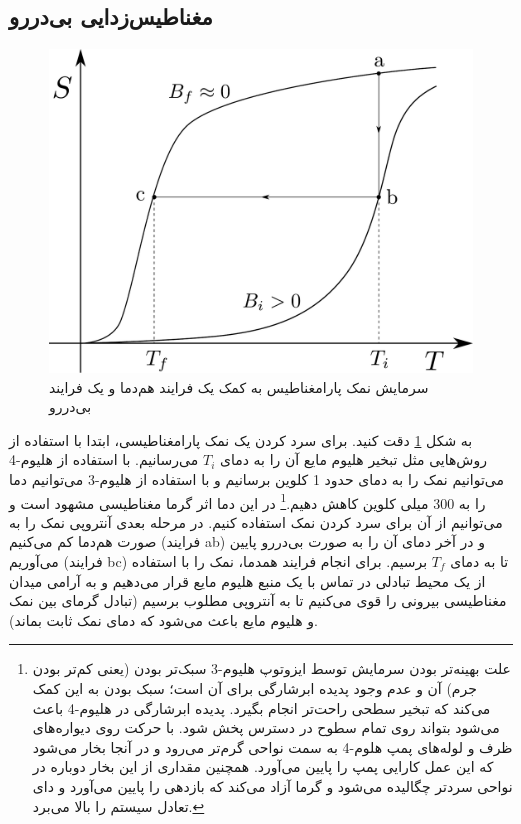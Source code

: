 \documentclass[12pt,a4paper]{article}
\begin{document}
	\subsection{مغناطیس‌زدایی بی‌دررو}
	\begin{figure}[h]
		\centering
		\includegraphics[width=\linewidth]{mag}
		\caption{سرمایش نمک پارامغناطیس به کمک یک فرایند هم‌دما و یک فرایند بی‌دررو}
		\label{fig1}
	\end{figure}
	به شکل \ref{fig1} دقت کنید. برای سرد کردن یک نمک پارامغناطیسی، ابتدا با استفاده از روش‌هایی مثل تبخیر هلیوم مایع آن را به دمای $T_i$ می‌رسانیم.
	با استفاده از هلیوم-4 می‌توانیم نمک را به دمای حدود 1 کلوین برسانیم و با استفاده از هلیوم-3 می‌توانیم دما را به 300 میلی کلوین کاهش دهیم.\footnote{
	علت بهینه‌تر بودن سرمایش توسط ایزوتوپ هلیوم-3 سبک‌تر بودن (یعنی کم‌تر بودن جرم) آن و عدم وجود پدیده ابرشارگی برای آن است؛
	سبک بودن به این کمک می‌کند که تبخیر سطحی راحت‌تر انجام بگیرد. پدیده ابرشارگی در هلیوم-4 باعث می‌شود بتواند روی تمام سطوح در دسترس پخش شود.
	با حرکت روی دیواره‌های ظرف و لوله‌های پمپ هلوم-4 به سمت نواحی گرم‌تر می‌رود و در آنجا بخار می‌شود که این عمل کارایی پمپ را پایین می‌آورد.
	همچنین مقداری از این بخار دوباره در نواحی سردتر چگالیده می‌شود و گرما آزاد می‌کند که بازدهی را پایین می‌آورد و دای تعادل سیستم را بالا می‌برد.}
	در این دما اثر گرما مغناطیسی مشهود است و می‌توانیم از آن برای سرد کردن نمک استفاده کنیم.
	در مرحله بعدی آنتروپی نمک را به صورت هم‌دما کم می‌کنیم (فرایند ab) و در آخر دمای آن را به صورت بی‌دررو پایین می‌آوریم (فرایند bc) تا به دمای $T_f$ برسیم.
	برای انجام فرایند همدما، نمک را با استفاده از یک محیط تبادلی در تماس با یک منبع هلیوم مایع قرار می‌دهیم و
	به آرامی میدان مغناطیسی بیرونی را قوی می‌کنیم تا به آنتروپی مطلوب برسیم (تبادل گرمای بین نمک و هلیوم مایع باعث می‌شود که دمای نمک ثابت بماند).
\end{document}
